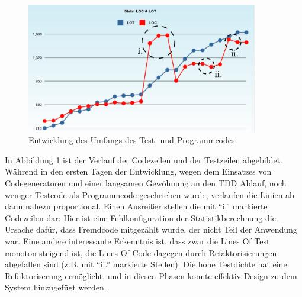 \begin{figure}[htbp]
 \centering
 \includegraphics[width=0.9\textwidth]{./diagrams/itjobs-loclot.pdf}
 \caption{Entwicklung des Umfangs des Test- und Programmcodes}
 \label{fig:itjobsLoc}
\end{figure}

In Abbildung \ref{fig:itjobsLoc} ist der Verlauf der Codezeilen und der Testzeilen abgebildet. Während in den ersten Tagen der Entwicklung, wegen dem Einsatzes von Codegeneratoren und einer langsamen Gewöhnung an den TDD Ablauf, noch weniger Testcode als Programmcode geschrieben wurde, verlaufen die Linien ab dann nahezu proportional. Einen Ausreißer stellen die mit "`i."' markierte Codezeilen dar: Hier ist eine Fehlkonfiguration der Statistikberechnung die Ursache dafür, dass Fremdcode mitgezählt wurde, der nicht Teil der Anwendung war. Eine andere interessante Erkenntnis ist, dass zwar die Lines Of Test monoton steigend ist, die Lines Of Code dagegen durch Refaktorisierungen abgefallen sind (z.B. mit "`ii."' markierte Stellen). Die hohe Testdichte hat eine Refaktoriserung ermöglicht, und in diesen Phasen konnte effektiv Design zu dem System hinzugefügt werden.


